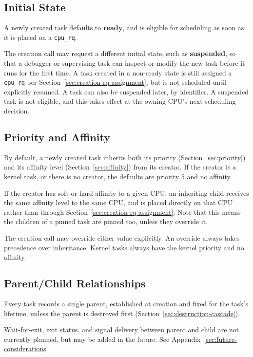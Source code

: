 \documentclass[11pt]{article}
\begin{document}
\subsection{Initial State}

A newly created task defaults to \textbf{ready}, and is eligible for scheduling as soon as it is placed on a \texttt{cpu\_rq}.

The creation call may request a different initial state, such as \textbf{suspended}, so that a debugger or supervising task can inspect or modify the new task before it runs for the first time.
A task created in a non-ready state is still assigned a \texttt{cpu\_rq} per Section~\ref{sec:creation-rq-assignment}, but is not scheduled until explicitly resumed.
A task can also be suspended later, by identifier. A suspended task is not eligible, and this takes effect at the owning CPU's next scheduling decision.

\subsection{Priority and Affinity}
\label{sec:creation-priority-affinity}

By default, a newly created task inherits both its priority (Section~\ref{sec:priority}) and its affinity level (Section~\ref{sec:affinity}) from its creator.
If the creator is a kernel task, or there is no creator, the defaults are priority 5 and no affinity.

If the creator has soft or hard affinity to a given CPU, an inheriting child receives the same affinity level to the same CPU, and is placed directly on that CPU rather than through Section~\ref{sec:creation-rq-assignment}.
Note that this means the children of a pinned task are pinned too, unless they override it.

The creation call may override either value explicitly. An override always takes precedence over inheritance.
Kernel tasks always have the kernel priority and no affinity.

\subsection{Parent/Child Relationships}
\label{sec:creation-parentage}

Every task records a single parent, established at creation and fixed for the task's lifetime, unless the parent is destroyed first (Section~\ref{sec:destruction-cascade}).

Wait-for-exit, exit status, and signal delivery between parent and child are not currently planned, but may be added in the future. See Appendix~\ref{sec:future-considerations}.
\end{document}
